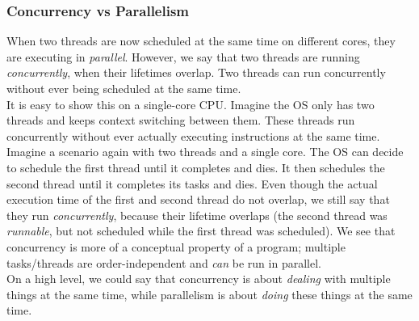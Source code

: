 \documentclass[main]{subfiles}
\begin{document}
\subsubsection{Concurrency vs Parallelism}
When two threads are now scheduled at the same time on different cores, they are executing in \textit{parallel}. However, we say that two threads are running \textit{concurrently}, when their lifetimes overlap. Two threads can run concurrently without ever being scheduled at the same time.\\
It is easy to show this on a single-core CPU. Imagine the OS only has two threads and keeps context switching between them. These threads run concurrently without ever actually executing instructions at the same time.\\[3mm]
Imagine a scenario again with two threads and a single core. The OS can decide to schedule the first thread until it completes and dies. It then schedules the second thread until it completes its tasks and dies. Even though the actual execution time of the first and second thread do not overlap, we still say that they run \textit{concurrently}, because their lifetime overlaps (the second thread was \textit{runnable}, but not scheduled while the first thread was scheduled). We see that concurrency is more of a conceptual property of a program; multiple tasks/threads are order-independent and \textit{can} be run in parallel.\\[3mm]
On a high level, we could say that concurrency is about \textit{dealing} with multiple things at the same time, while parallelism is about \textit{doing} these things at the same time.
\end{document}
